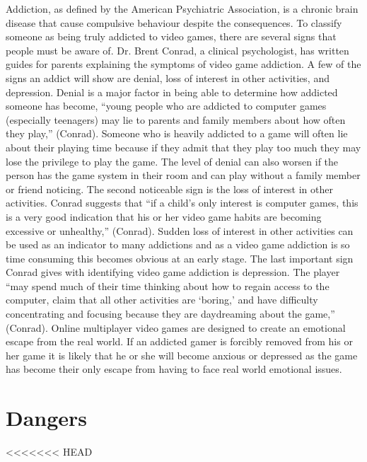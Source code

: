 \documentclass[a4paper,man,natbib]{apa6}
\renewcommand{\paragraph}{}
\begin{document}
\paragraph{}Addiction, as defined by the American Psychiatric Association, is a chronic brain disease that cause compulsive behaviour despite the consequences. To classify someone as being truly addicted to video games, there are several signs that people must be aware of. Dr. Brent Conrad, a clinical psychologist, has written guides for parents explaining the symptoms of video game addiction. A few of the signs an addict will show are denial, loss of interest in other activities, and depression. Denial is a major factor in being able to determine how addicted someone has become, “young people who are addicted to computer games (especially teenagers) may lie to parents and family members about how often they play,” (Conrad). Someone who is heavily addicted to a game will often lie about their playing time because if they admit that they play too much they may lose the privilege to play the game. The level of denial can also worsen if the person has the game system in their room and can play without a family member or friend noticing. The second noticeable sign is the loss of interest in other activities. Conrad suggests that “if a child’s only interest is computer games, this is a very good indication that his or her video game habits are becoming excessive or unhealthy,” (Conrad). Sudden loss of interest in other activities can be used as an indicator to many addictions and as a video game addiction is so time consuming this becomes obvious at an early stage. The last important sign Conrad gives with identifying video game addiction is depression. The player “may spend much of their time thinking about how to regain access to the computer, claim that all other activities are ‘boring,’ and have difficulty concentrating and focusing because they are daydreaming about the game,” (Conrad). Online multiplayer video games are designed to create an emotional escape from the real world. If an addicted gamer is forcibly removed from his or her game it is likely that he or she will become anxious or depressed as the game has become their only escape from having to face real world emotional issues.

\section{Dangers}
<<<<<<< HEAD
\end{document}
